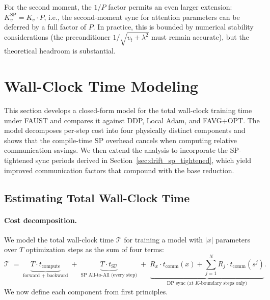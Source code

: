 \documentclass{article}
\begin{document}
For the second moment, the $1/P$ factor permits an even larger extension:
$K_v^{\text{SP}} = K_v \cdot P$, i.e., the second-moment sync for attention
parameters can be deferred by a full factor of $P$. In practice, this is
bounded by numerical stability considerations (the preconditioner
$1/\sqrt{v_t + \lambda^2}$ must remain accurate), but the theoretical
headroom is substantial.




\section{Wall-Clock Time Modeling}
\label{sec:wallclock_model}

This section develops a closed-form model for the total wall-clock
training time under FAUST and compares it against DDP, Local Adam,
and FAVG+OPT. The model decomposes per-step cost into four physically
distinct components and shows that the compile-time SP overhead cancels
when computing relative communication savings.
We then extend the analysis to incorporate the SP-tightened sync
periods derived in Section~\ref{sec:drift_sp_tightened}, which yield
improved communication factors that compound with the base reduction.

\subsection{Estimating Total Wall-Clock Time}
\label{sec:wallclock_bandwidth}

\paragraph{Cost decomposition.}
We model the total wall-clock time $\mathcal{T}$ for training a model
with $|x|$ parameters over $T$ optimization steps as the sum of four
terms:
\begin{equation}
\mathcal{T} \;=\;
\underbrace{T \cdot t_{\text{compute}}}_{\text{forward + backward}}
\;+\; \underbrace{T \cdot t_{\text{SP}}}_{\text{SP All-to-All (every step)}}
\;+\; \underbrace{R_x \cdot t_{\text{comm}}(x)
  + \sum_{j=1}^{N} R_j \cdot t_{\text{comm}}(s^j)
  }_{\text{DP sync (at $K$-boundary steps only)}}.
\label{eq:wallclock_total}
\end{equation}
We now define each component from first principles.
\end{document}
